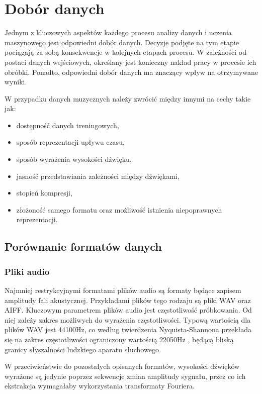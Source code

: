 \chapter {Dobór danych} 
{
    Jednym z kluczowych aspektów każdego procesu analizy danych i uczenia maszynowego
    jest odpowiedni dobór danych. Decyzje podjęte na tym etapie pociągają za sobą 
    konsekwencje w kolejnych etapach procesu. W zależności od postaci danych wejściowych,
    określany jest konieczny nakład pracy w procesie ich obróbki. 
    Ponadto, odpowiedni dobór danych ma znaczący wpływ na otrzymywane wyniki.

    W przypadku danych muzycznych należy zwrócić między innymi na cechy takie jak:
    \begin{itemize}
        \item dostępność danych treningowych,
        \item sposób reprezentacji upływu czasu,
        \item sposób wyrażenia wysokości dźwięku,
        \item jasność przedstawiania zależności między dźwiękami,
        \item stopień kompresji,
        \item złożoność samego formatu oraz możliwość istnienia niepoprawnych reprezentacji.
    \end{itemize}

    \section{Porównanie formatów danych}
    {
        \subsection{Pliki audio}
        {
            Najmniej restrykcyjnymi formatami plików audio są formaty będące zapisem
            amplitudy fali akustycznej. Przykładami plików tego rodzaju są pliki WAV
            oraz AIFF.
            Kluczowym parametrem plików audio jest częstotliwość próbkowania. Od niej
            zależy zakres możliwych do wyrażenia częstotliwości. Typową wartością dla plików
            WAV jest 44100Hz, co według twierdzenia Nyquista-Shannona przekłada się na zakres
            częstotliwości ograniczony wartością 22050Hz \cite{Shannon1949CommunicationIT}, będącą bliską granicy słyszalności
            ludzkiego aparatu słuchowego. 

            W przeciwieństwie do pozostałych opisanych formatów, wysokości dźwięków wyrażone są 
            jedynie poprzez sekwencje zmian amplitudy sygnału, przez co
            ich ekstrakcja wymagałaby wykorzystania transformaty Fouriera.

}}}
